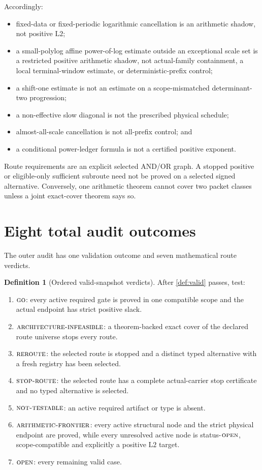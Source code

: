 \documentclass[11pt]{article}
\theoremstyle{definition}
\newtheorem{definition}[theorem]{Definition}
\theoremstyle{remark}
\newcommand{\GO}{\textnormal{\textsc{go}}}
\newcommand{\AINF}{\textnormal{\textsc{architecture-infeasible}}}
\newcommand{\REROUTE}{\textnormal{\textsc{reroute}}}
\newcommand{\STOPR}{\textnormal{\textsc{stop-route}}}
\newcommand{\NT}{\textnormal{\textsc{not-testable}}}
\newcommand{\AF}{\textnormal{\textsc{arithmetic-frontier}}}
\newcommand{\OPEN}{\textnormal{\textsc{open}}}
\newcommand{\Ltwo}{\mathrm{L2}}
\begin{document}
Accordingly:
\begin{itemize}[leftmargin=2em]
\item fixed-data or fixed-periodic logarithmic cancellation is an
  arithmetic shadow, not positive \(\Ltwo\);
\item a small-polylog affine power-of-log estimate outside an
  exceptional scale set is a restricted positive arithmetic shadow,
  not actual-family containment, a local terminal-window estimate, or
  deterministic-prefix control;
\item a shift-one estimate is not an estimate on a scope-mismatched
  determinant-two progression;
\item a non-effective slow diagonal is not the prescribed physical
  schedule;
\item almost-all-scale cancellation is not all-prefix control; and
\item a conditional power-ledger formula is not a certified positive
  exponent.
\end{itemize}

Route requirements are an explicit selected AND/OR graph.  A stopped
positive or eligible-only sufficient subroute need not be proved on a
selected signed alternative.  Conversely, one arithmetic theorem
cannot cover two packet classes unless a joint exact-cover theorem
says so.

\section{Eight total audit outcomes}

The outer audit has one validation outcome and seven mathematical
route verdicts.

\begin{definition}[Ordered valid-snapshot verdicts]
\label{def:verdicts}
After \cref{def:valid} passes, test:
\begin{enumerate}[label=(\roman*),leftmargin=2.2em]
\item \(\GO\): every active required gate is proved in one compatible
  scope and the actual endpoint has strict positive slack.
\item \(\AINF\): a theorem-backed exact cover of the declared route
  universe stops every route.
\item \(\REROUTE\): the selected route is stopped and a distinct
  typed alternative with a fresh registry has been selected.
\item \(\STOPR\): the selected route has a complete actual-carrier
  stop certificate and no typed alternative is selected.
\item \(\NT\): an active required artifact or type is absent.
\item \(\AF\): every active structural node and the strict physical
  endpoint are proved, while every unresolved active node is
  status-\(\OPEN\), scope-compatible and explicitly a positive
  \(\Ltwo\) target.
\item \(\OPEN\): every remaining valid case.
\end{enumerate}
\end{definition}
\end{document}

